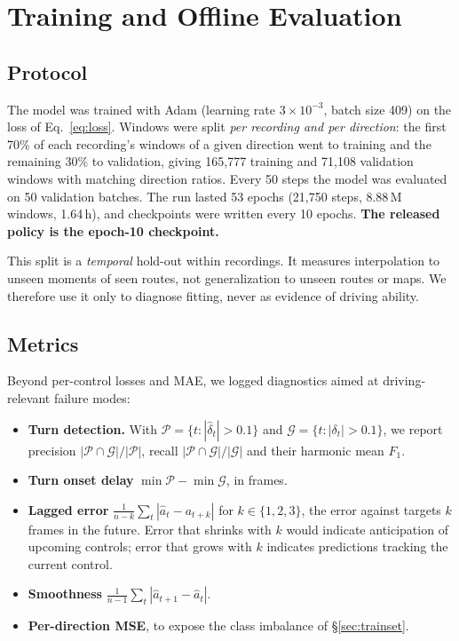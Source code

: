 \documentclass[11pt]{article}
\begin{document}
\section{Training and Offline Evaluation}
\label{sec:training}

\subsection{Protocol}

The model was trained with Adam (learning rate $3\times10^{-3}$, batch size 409) on the loss of Eq.~\ref{eq:loss}. Windows were split \emph{per recording and per direction}: the first 70\% of each recording's windows of a given direction went to training and the remaining 30\% to validation, giving 165,777 training and 71,108 validation windows with matching direction ratios. Every 50 steps the model was evaluated on 50 validation batches. The run lasted 53 epochs (21,750 steps, 8.88\,M windows, 1.64\,h), and checkpoints were written every 10 epochs. \textbf{The released policy is the epoch-10 checkpoint.}

This split is a \emph{temporal} hold-out within recordings. It measures interpolation to unseen moments of seen routes, not generalization to unseen routes or maps. We therefore use it only to diagnose fitting, never as evidence of driving ability.

\subsection{Metrics}

Beyond per-control losses and MAE, we logged diagnostics aimed at driving-relevant failure modes:
\begin{itemize}
  \item \textbf{Turn detection.} With $\mathcal P = \{t : |\hat\delta_t| > 0.1\}$ and $\mathcal G = \{t : |\delta_t| > 0.1\}$, we report precision $|\mathcal P\cap\mathcal G|/|\mathcal P|$, recall $|\mathcal P\cap\mathcal G|/|\mathcal G|$ and their harmonic mean $F_1$.
  \item \textbf{Turn onset delay} $\min\mathcal P - \min\mathcal G$, in frames.
  \item \textbf{Lagged error} $\tfrac{1}{n-k}\sum_t|\hat a_t - a_{t+k}|$ for $k\in\{1,2,3\}$, the error against targets $k$ frames in the future. Error that shrinks with $k$ would indicate anticipation of upcoming controls; error that grows with $k$ indicates predictions tracking the current control.
  \item \textbf{Smoothness} $\tfrac{1}{n-1}\sum_t |\hat a_{t+1}-\hat a_t|$.
  \item \textbf{Per-direction MSE}, to expose the class imbalance of \S\ref{sec:trainset}.
\end{itemize}
\end{document}
